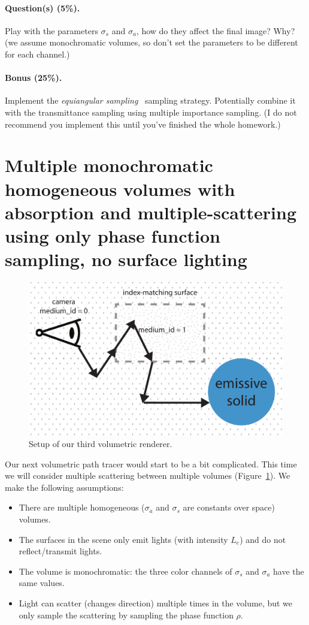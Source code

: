 \paragraph{Question(s) (5\%).} Play with the parameters $\sigma_s$ and $\sigma_a$, how do they affect the final image? Why? (we assume monochromatic volumes, so don't set the parameters to be different for each channel.)

\paragraph{Bonus (25\%).} Implement the \emph{equiangular sampling}~\cite{Kulla:2012:IST} sampling strategy. Potentially combine it with the transmittance sampling using multiple importance sampling. (I do not recommend you implement this until you've finished the whole homework.)

\section{Multiple monochromatic homogeneous volumes with absorption and multiple-scattering using only phase function sampling, no surface lighting}
\begin{figure}
\includegraphics[width=\linewidth]{imgs/multiple_scattering.pdf}
\caption{Setup of our third volumetric renderer.}
\label{fig:volpath3_illustration}
\end{figure}
Our next volumetric path tracer would start to be a bit complicated. This time we will consider multiple scattering between multiple volumes (Figure~\ref{fig:volpath3_illustration}). We make the following assumptions:
\begin{itemize}
    \item There are multiple homogeneous ($\sigma_a$ and $\sigma_s$ are constants over space) volumes.
    \item The surfaces in the scene only emit lights (with intensity $L_e$) and do not reflect/transmit lights.
    \item The volume is monochromatic: the three color channels of $\sigma_s$ and $\sigma_a$ have the same values.
    \item Light can scatter (changes direction) multiple times in the volume, but we only sample the scattering by sampling the phase function $\rho$.
\end{itemize}

